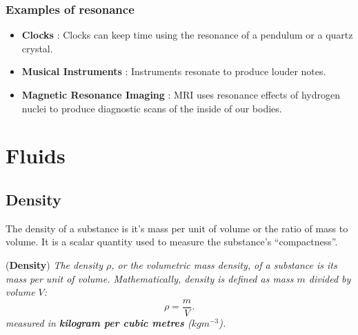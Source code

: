 \subsubsection*{Examples of resonance}
\begin{itemize}
    \item \textbf{Clocks} : Clocks can keep time using the resonance of a pendulum or a quartz crystal.
    \item \textbf{Musical Instruments} : Instruments resonate to produce louder notes. 
    \item \textbf{Magnetic Resonance Imaging} : MRI uses resonance effects of hydrogen nuclei to produce diagnostic scans of the inside of our bodies. 
\end{itemize}

\section{Fluids}

\subsection{Density}

The density of a substance is it's mass per unit of volume or the ratio of mass to volume. It is a scalar quantity used to measure the substance's ``compactness''. 

\begin{definition}{(\textbf{Density})}
\textit{The density $\rho$, or the volumetric mass density, of a substance is its mass per unit of volume. Mathematically, density is defined as mass $m$ divided by volume $V$:}
\begin{equation}
    \rho = \frac{m}{V}.
\end{equation}
\textit{measured in \textbf{kilogram per cubic metres} ($kgm^{-3}$).}
\end{definition}

